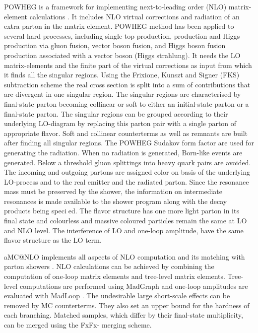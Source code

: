 POWHEG is a framework for implementing next-to-leading order (NLO) matrix-element calculations \cite{Alioli:2010xd}. It includes NLO virtual corrections and radiation of an extra parton in the matrix element. POWHEG method has been applied to several hard processes, including single top production, \ttbar production and Higgs production via gluon fusion, vector boson fusion, and Higgs boson fusion production associated with a vector boson (Higgs strahlung). It needs the LO matrix-elements and the finite part of the virtual corrections as input from which it finds all the singular regions. Using the Frixione, Kunszt and Signer (FKS) subtraction scheme \cite{Frixione:1995ms, Frixione:1997np} the real cross section is split into a sum of contributions that are divergent in one singular region. The singular regions are characterised by final-state parton becoming collinear or soft to either an initial-state parton or a final-state parton. The singular regions can be grouped according to their underlying LO-diagram by replacing this parton pair with a single parton of appropriate flavor. Soft and collinear counterterms as well as remnants are built after finding all singular regions. The POWHEG Sudakov form factor are used for generating the radiation. When no radiation is generated, Born-like events are generated. Below a threshold gluon splittings into heavy quark pairs are avoided. The incoming and outgoing partons are assigned color on basis of the underlying LO-process and to the real emitter and the radiated parton. Since the resonance mass must be preserved by the shower, the information on intermediate resonances is made available to the shower program along with the decay products being specied. The flavor structure has one more light parton in its final state and colourless and massive coloured particles remain the same at LO and NLO level. The interference of LO and one-loop amplitude, have the same flavor structure as the LO term.

aMC@NLO implements all aspects of NLO computation and its matching with parton showers \cite{Frederix:2011ss, Alwall:2014hca}. NLO calculations can be achieved by combining the computation of one-loop matrix elements and tree-level matrix elements. Tree-level computations are performed using MadGraph and one-loop amplitudes are evaluated with MadLoop \cite{Hirschi:2011pa}. The undesirable large short-scale effects can be removed by MC counterterms. They also set an upper bound for the hardness of each branching. Matched samples, which differ by their final-state multiplicity, can be merged using the FxFx- merging scheme.

